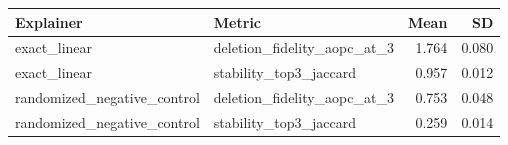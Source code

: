 \begin{tabular}{llrr}
\toprule
Explainer & Metric & Mean & SD \\
\midrule
exact\_linear & deletion\_fidelity\_aopc\_at\_3 & 1.764 & 0.080 \\
exact\_linear & stability\_top3\_jaccard & 0.957 & 0.012 \\
randomized\_negative\_control & deletion\_fidelity\_aopc\_at\_3 & 0.753 & 0.048 \\
randomized\_negative\_control & stability\_top3\_jaccard & 0.259 & 0.014 \\
\bottomrule
\end{tabular}